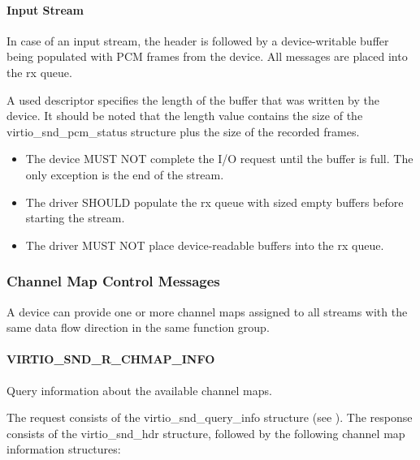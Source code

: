 \paragraph{Input Stream}

In case of an input stream, the header is followed by a device-writable buffer
being populated with PCM frames from the device. All messages are placed into
the rx queue.

A used descriptor specifies the length of the buffer that was written by the
device. It should be noted that the length value contains the size of the
virtio_snd_pcm_status structure plus the size of the recorded frames.


\begin{itemize}
\item The device MUST NOT complete the I/O request until the buffer is full.
The only exception is the end of the stream.
\end{itemize}


\begin{itemize}
\item The driver SHOULD populate the rx queue with  sized
empty buffers before starting the stream.
\item The driver MUST NOT place device-readable buffers into the rx queue.
\end{itemize}

\subsubsection{Channel Map Control Messages}\label{sec:Device Types / Sound Device / Device Operation / Channel Map Control Messages}

A device can provide one or more channel maps assigned to all streams with
the same data flow direction in the same function group.

\paragraph{VIRTIO_SND_R_CHMAP_INFO}

Query information about the available channel maps.

The request consists of the virtio_snd_query_info structure
(see ).
The response consists of the virtio_snd_hdr structure, followed by the following
channel map information structures:

